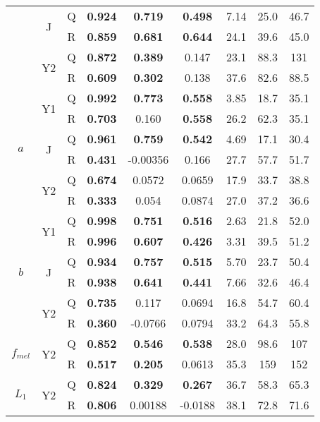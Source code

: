 \begin{table}[h!]
\begin{tabular}{|ccc|ccc|ccc|}
        \cline{2-9}
        & \multirow{2}{*}{J} & Q & \textbf{0.924} & \textbf{0.719} & \textbf{0.498} & 7.14 & 25.0 & 46.7 \\
        & & R & \textbf{0.859} & \textbf{0.681} & \textbf{0.644} & 24.1 & 39.6 & 45.0 \\
        \cline{2-9}
        & \multirow{2}{*}{Y2} & Q & \textbf{0.872} & \textbf{0.389} & 0.147 & 23.1 & 88.3 & 131 \\
        & & R & \textbf{0.609} & \textbf{0.302} & 0.138 & 37.6 & 82.6 & 88.5 \\
        \hline
        \multirow{6}{*}{$a$} & \multirow{2}{*}{Y1} & Q & \textbf{0.992} & \textbf{0.773} & \textbf{0.558} & 3.85 & 18.7 & 35.1 \\
        & & R & \textbf{0.703} & 0.160 & \textbf{0.558} & 26.2 & 62.3 & 35.1 \\
        \cline{2-9}
        & \multirow{2}{*}{J} & Q & \textbf{0.961} & \textbf{0.759} & \textbf{0.542} & 4.69 & 17.1 & 30.4 \\
        & & R & \textbf{0.431} & -0.00356 & 0.166 & 27.7 & 57.7 & 51.7 \\
        \cline{2-9}
        & \multirow{2}{*}{Y2} & Q & \textbf{0.674} & 0.0572 & 0.0659 & 17.9 & 33.7 & 38.8 \\
        & & R & \textbf{0.333} & 0.054 & 0.0874 & 27.0 & 37.2 & 36.6 \\
        \hline
        \multirow{6}{*}{$b$} & \multirow{2}{*}{Y1} & Q & \textbf{0.998} & \textbf{0.751} & \textbf{0.516} & 2.63 & 21.8 & 52.0 \\
        & & R & \textbf{0.996} & \textbf{0.607} & \textbf{0.426} & 3.31 & 39.5 & 51.2 \\
        \cline{2-9}
        & \multirow{2}{*}{J} & Q & \textbf{0.934} & \textbf{0.757} & \textbf{0.515} & 5.70 & 23.7 & 50.4 \\
        & & R & \textbf{0.938} & \textbf{0.641} & \textbf{0.441} & 7.66 & 32.6 & 46.4 \\
        \cline{2-9}
        & \multirow{2}{*}{Y2} & Q & \textbf{0.735} & 0.117 & 0.0694 & 16.8 & 54.7 & 60.4 \\
        & & R & \textbf{0.360} & -0.0766 & 0.0794 & 33.2 & 64.3 & 55.8 \\
        \hline
        \multirow{2}{*}{$f_{mel}$} & \multirow{2}{*}{Y2} & Q & \textbf{0.852} & \textbf{0.546} & \textbf{0.538} & 28.0 & 98.6 & 107 \\ 
        & & R & \textbf{0.517} & \textbf{0.205} & 0.0613 & 35.3 & 159 & 152 \\
        \hline
        \multirow{2}{*}{$L_1$} & \multirow{2}{*}{Y2} & Q & \textbf{0.824} & \textbf{0.329} & \textbf{0.267} & 36.7 & 58.3 & 65.3 \\
        & & R & \textbf{0.806} & 0.00188 & -0.0188 & 38.1 & 72.8 & 71.6 \\
        \hline
    \end{tabular}    
    \label{tb:backwardsHSIMC}
\end{table}

